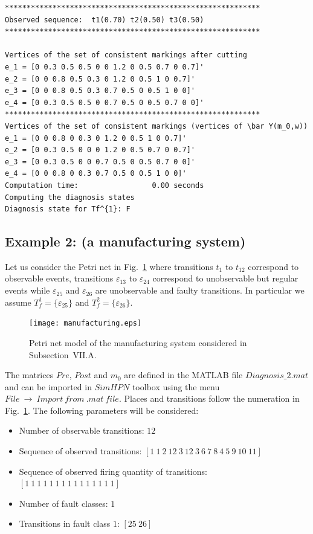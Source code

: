 \begin{verbatim}
***********************************************************
Observed sequence:  t1(0.70) t2(0.50) t3(0.50)
***********************************************************

Vertices of the set of consistent markings after cutting
e_1 = [0 0.3 0.5 0.5 0 0 1.2 0 0.5 0.7 0 0.7]'
e_2 = [0 0 0.8 0.5 0.3 0 1.2 0 0.5 1 0 0.7]'
e_3 = [0 0 0.8 0.5 0.3 0.7 0.5 0 0.5 1 0 0]'
e_4 = [0 0.3 0.5 0.5 0 0.7 0.5 0 0.5 0.7 0 0]'
***********************************************************
Vertices of the set of consistent markings (vertices of \bar Y(m_0,w))
e_1 = [0 0 0.8 0 0.3 0 1.2 0 0.5 1 0 0.7]'
e_2 = [0 0.3 0.5 0 0 0 1.2 0 0.5 0.7 0 0.7]'
e_3 = [0 0.3 0.5 0 0 0.7 0.5 0 0.5 0.7 0 0]'
e_4 = [0 0 0.8 0 0.3 0.7 0.5 0 0.5 1 0 0]'
Computation time:                 0.00 seconds
Computing the diagnosis states
Diagnosis state for Tf^{1}: F
\end{verbatim}

\subsection{Example 2: (a manufacturing system)}

Let us consider the Petri net in Fig.~\ref{model2} where transitions
$t_1$ to $t_{12}$ correspond to observable events, transitions
$\varepsilon_{13}$ to $\varepsilon_{24}$ correspond to unobservable
but regular events while $\varepsilon_{25}$ and $\varepsilon_{26}$
are unobservable and faulty transitions. In particular we assume
$T_f^1=\{\varepsilon_{25}\}$ and $T_f^2=\{\varepsilon_{26}\}$.

\begin{figure}
\begin{center}
\texttt{[image: manufacturing.eps]}
\end{center}
\caption{Petri net model of the manufacturing system considered in
Subsection~VII.A.} \label{model2}
\end{figure}

The matrices $Pre$, $Post$ and $m_0$ are defined in the MATLAB file
$Diagnosis\_2.mat$ and can be imported in $SimHPN$ toolbox using the menu $File\ \rightarrow \ Import\ from\ .mat\ file$. Places and transitions follow the numeration in Fig.~\ref{model2}. The following parameters will be considered:

\begin{itemize}
\item Number of observable transitions: $12$
\item Sequence of observed transitions: $[1  \   1  \   2  \  12 \    3 \    12 \    3  \   6 \    7 \    8  \   4   \  5 \    9\    10  \  11 ]$
\item Sequence of observed firing quantity of transitions: $[1  \   1 \    1 \    1   \  1    \ 1  \   1 \    1  \   1  \   1   \  1  \   1  \   1  \   1 \    1]$
\item Number of fault classes: $1$
\item Transitions in fault class $1$: $[25\ 26]$
\end{itemize}

